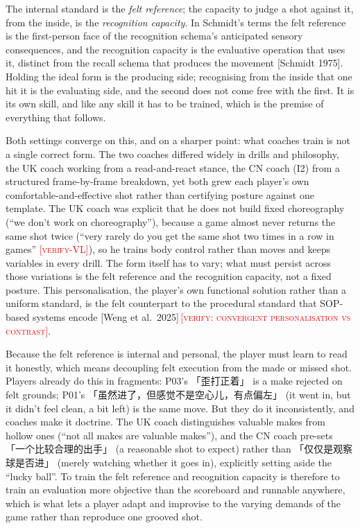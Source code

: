 \documentclass[sigconf]{acmart}
\newcommand{\vf}[1]{\textcolor{red}{[\textsc{#1}]}}
\begin{document}
The internal standard is the \emph{felt reference}; the capacity to judge a shot against it, from the inside, is the \emph{recognition capacity}. In Schmidt's terms the felt reference is the first-person face of the recognition schema's anticipated sensory consequences, and the recognition capacity is the evaluative operation that uses it, distinct from the recall schema that produces the movement [Schmidt 1975]. Holding the ideal form is the producing side; recognising from the inside that one hit it is the evaluating side, and the second does not come free with the first. It is its own skill, and like any skill it has to be trained, which is the premise of everything that follows.

Both settings converge on this, and on a sharper point: what coaches train is not a single correct form. The two coaches differed widely in drills and philosophy, the UK coach working from a read-and-react stance, the CN coach (I2) from a structured frame-by-frame breakdown, yet both grew each player's own comfortable-and-effective shot rather than certifying posture against one template. The UK coach was explicit that he does not build fixed choreography (``we don't work on choreography''), because a game almost never returns the same shot twice (``very rarely do you get the same shot two times in a row in games'' \vf{verify-VL}), so he trains body control rather than moves and keeps variables in every drill. The form itself has to vary; what must persist across those variations is the felt reference and the recognition capacity, not a fixed posture. This personalisation, the player's own functional solution rather than a uniform standard, is the felt counterpart to the procedural standard that SOP-based systems encode [Weng et al.\ 2025]\,\vf{verify: convergent personalisation vs contrast}.

Because the felt reference is internal and personal, the player must learn to read it honestly, which means decoupling felt execution from the made or missed shot. Players already do this in fragments: P03's 「歪打正着」 is a make rejected on felt grounds; P01's 「虽然进了，但感觉不是空心儿，有点偏左」 (it went in, but it didn't feel clean, a bit left) is the same move. But they do it inconsistently, and coaches make it doctrine. The UK coach distinguishes valuable makes from hollow ones (``not all makes are valuable makes''), and the CN coach pre-sets 「一个比较合理的出手」 (a reasonable shot to expect) rather than 「仅仅是观察球是否进」 (merely watching whether it goes in), explicitly setting aside the ``lucky ball''. To train the felt reference and recognition capacity is therefore to train an evaluation more objective than the scoreboard and runnable anywhere, which is what lets a player adapt and improvise to the varying demands of the game rather than reproduce one grooved shot.
\end{document}
